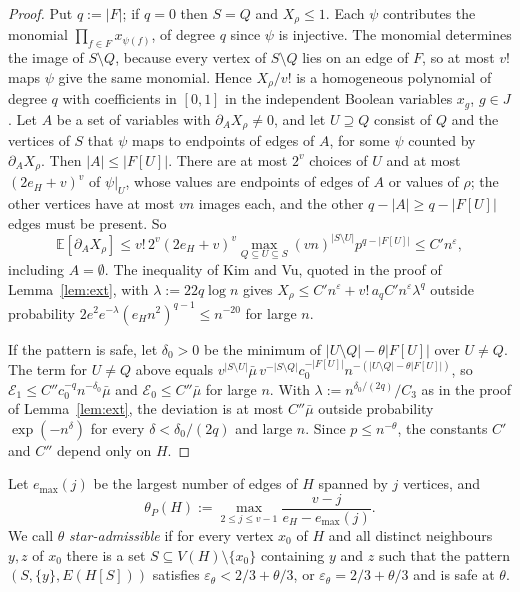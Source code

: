 \documentclass[11pt]{article}
\theoremstyle{remark}
\newcommand{\E}{\mathbb{E}}
\newcommand{\abs}[1]{\lvert #1\rvert}
\begin{document}
\begin{proof}
Put $q:=\abs F$; if $q=0$ then $S=Q$ and $X_\rho\le1$. Each $\psi$ contributes the monomial $\prod_{f\in F}x_{\psi(f)}$, of degree $q$ since $\psi$ is injective. The monomial determines the image of $S\setminus Q$, because every vertex of $S\setminus Q$ lies on an edge of $F$, so at most $v!$ maps $\psi$ give the same monomial. Hence $X_\rho/v!$ is a homogeneous polynomial of degree $q$ with coefficients in $[0,1]$ in the independent Boolean variables $x_g$, $g\in J$. Let $A$ be a set of variables with $\partial_AX_\rho\ne0$, and let $U\supseteq Q$ consist of $Q$ and the vertices of $S$ that $\psi$ maps to endpoints of edges of $A$, for some $\psi$ counted by $\partial_AX_\rho$. Then $\abs A\le\abs{F[U]}$. There are at most $2^v$ choices of $U$ and at most $(2e_H+v)^v$ of $\psi|_U$, whose values are endpoints of edges of $A$ or values of $\rho$; the other vertices have at most $vn$ images each, and the other $q-\abs A\ge q-\abs{F[U]}$ edges must be present. So
\[\E[\partial_AX_\rho]\le v!\,2^v(2e_H+v)^v\max_{Q\subseteq U\subseteq S}(vn)^{\abs{S\setminus U}}p^{q-\abs{F[U]}}\le C'n^\varepsilon,\]
including $A=\emptyset$. The inequality of Kim and Vu, quoted in the proof of Lemma~\ref{lem:ext}, with $\lambda:=22q\log n$ gives $X_\rho\le C'n^\varepsilon+v!\,a_qC'n^\varepsilon\lambda^q$ outside probability $2e^2e^{-\lambda}(e_Hn^2)^{q-1}\le n^{-20}$ for large $n$.

If the pattern is safe, let $\delta_0>0$ be the minimum of $\abs{U\setminus Q}-\theta\abs{F[U]}$ over $U\ne Q$. The term for $U\ne Q$ above equals $v^{\abs{S\setminus U}}\bar\mu\,v^{-\abs{S\setminus Q}}c_0^{-\abs{F[U]}}n^{-(\abs{U\setminus Q}-\theta\abs{F[U]})}$, so $\mathcal E_1\le C''c_0^{-q}n^{-\delta_0}\bar\mu$ and $\mathcal E_0\le C''\bar\mu$ for large $n$. With $\lambda:=n^{\delta_0/(2q)}/C_3$ as in the proof of Lemma~\ref{lem:ext}, the deviation is at most $C''\bar\mu$ outside probability $\exp(-n^{\delta})$ for every $\delta<\delta_0/(2q)$ and large $n$. Since $p\le n^{-\theta}$, the constants $C'$ and $C''$ depend only on $H$.
\end{proof}

Let $e_{\max}(j)$ be the largest number of edges of $H$ spanned by $j$ vertices, and
\[\theta_P(H):=\max_{2\le j\le v-1}\frac{v-j}{e_H-e_{\max}(j)}.\]
We call $\theta$ \emph{star-admissible} if for every vertex $x_0$ of $H$ and all distinct neighbours $y,z$ of $x_0$ there is a set $S\subseteq V(H)\setminus\{x_0\}$ containing $y$ and $z$ such that the pattern $(S,\{y\},E(H[S]))$ satisfies $\varepsilon_\theta<2/3+\theta/3$, or $\varepsilon_\theta=2/3+\theta/3$ and is safe at $\theta$.
\end{document}
